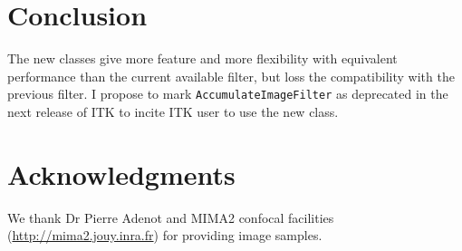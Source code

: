 \documentclass{InsightArticle}
\begin{document}
\section{Conclusion}
The new classes give more feature and more flexibility with equivalent
performance than the current available filter, but loss the compatibility with
the previous filter. I propose to mark \verb$AccumulateImageFilter$ as deprecated in
the next release of ITK to incite ITK user to use the new class.


\section{Acknowledgments}
We thank Dr Pierre Adenot and MIMA2 confocal facilities
(\url{http://mima2.jouy.inra.fr})
for providing image samples.


\appendix





\nocite{ITKSoftwareGuide}
\end{document}
